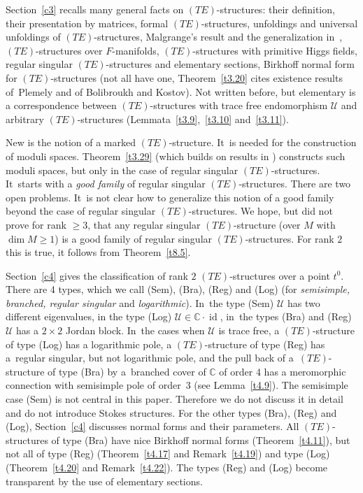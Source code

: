 \documentclass[10pt,a4paper]{amsart}
\numberwithin{equation}{section}
\numberwithin{figure}{section}
\newcommand{\C}{{\mathbb C}}
\newcommand{\UU}{{\mathcal U}}
\DeclareMathOperator{\id}{id}
\begin{document}
Section~\ref{c3} recalls many general facts on
$(TE)$-structures: their definition, their presentation
by matrices, formal $(TE)$-structures, unfoldings and
universal unfoldings of $(TE)$-structures, Malgrange's
result and the generalization in~\cite{HM04},
$(TE)$-structures over $F$-manifolds, $(TE)$-structures
with primitive Higgs fields, regular singular $(TE)$-structures
and elementary sections, Birkhoff normal form for
$(TE)$-structures (not all have one, Theorem~\ref{t3.20} cites
existence results of~Ple\-mely and of Bolibroukh and Kostov).
Not written before, but elementary is a correspondence
between $(TE)$-structures with trace free endomorphism
$\UU$ and arbitrary $(TE)$-structures (Lem\-mata~\ref{t3.9},~\ref{t3.10} and~\ref{t3.11}).

New is the notion of a marked $(TE)$-structure. It~is needed for the construction of moduli spaces.
Theorem~\ref{t3.29} (which builds on results in
\cite{HS10}) constructs such moduli spaces, but
only in the case of regular singular $(TE)$-structures. It~starts with a {\it good family} of regular
singular $(TE)$-structures. There are two open problems. It~is not clear how to generalize this notion of a good
family beyond the case of regular singular $(TE)$-structures.
We hope, but did not prove for rank $\geq 3$, that
any regular singular $(TE)$-structure (over $M$ with
$\dim M\geq 1$) is a good family of regular singular
$(TE)$-structures. For rank $2$ this is true, it follows
from Theorem~\ref{t8.5}.

Section~\ref{c4} gives the classification of rank $2$
$(TE)$-structures over a point $t^0$. There are 4 types,
which we call (Sem), (Bra), (Reg) and (Log)
(for {\it semisimple, branched, regular singular} and
{\it logarithmic}). In~the type (Sem) $\UU$ has two
different eigenvalues, in the type (Log) $\UU\in\C\cdot\id$,
in~the types (Bra) and (Reg) $\UU$ has a $2\times 2$
Jordan block. In~the cases when $\UU$ is trace free,
a $(TE)$-structure of type (Log) has a logarithmic pole,
a $(TE)$-structure of type (Reg) has a~regular singular,
but not logarithmic pole, and the pull back of a~$(TE)$-structure of type (Bra) by a~branched cover of $\C$
of order 4 has a meromorphic connection with
semisimple pole of order~3 (see Lemma~\ref{t4.9}).
The semisimple case (Sem) is not central in this paper.
Therefore we do not discuss it in detail
and do not introduce Stokes structures. For the other types
(Bra), (Reg) and (Log), Section~\ref{c4} discusses normal forms
and their parameters. All $(TE)$-structures of type (Bra)
have nice Birkhoff normal forms (Theorem~\ref{t4.11}),
but not all of type (Reg) (Theorem~\ref{t4.17} and Remark~\ref{t4.19}) and type (Log) (Theorem~\ref{t4.20} and
Remark~\ref{t4.22}). The types (Reg) and (Log) become
transparent by the use of elementary sections.
\end{document}
